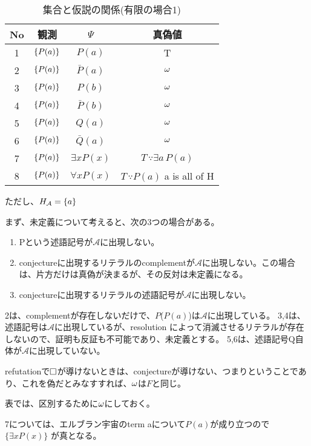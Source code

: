 \documentclass[10pt, oneside]{jarticle}   	%
\begin{document}
\begin{table}[htbp]
 \centering
 \begin{tabular}{|c|c|c|c|}\hline
   No & 観測 & $\Psi$ & 真偽値 \\ \hline
   1 & $\{{P(a)}\}$ & $P(a)$ & T \\ \hline
   2 & $\{{P(a)}\}$ & $\bar P(a)$ &$\omega$  \\ \hline
   3 & $\{{P(a)}\}$ & $P(b)$ & $\omega$ \\ \hline
   4 & $\{{P(a)}\}$ & $\bar P(b)$ & $\omega$ \\ \hline
   5 & $\{{P(a)}\}$ & $Q(a)$ & $\omega$ \\ \hline
   6 & $\{{P(a)}\}$ & $\bar Q(a)$ & $\omega$ \\ \hline
   7 & $\{{P(a)}\}$ & $\exists x P(x)$ & $T \, \because \exists a \, P(a)$ \\ \hline
   8 & $\{{P(a)}\}$ & $\forall x P(x)$ & $T  \, \because P(a) $ a  is all of  H \\ \hline
 \end{tabular}
 \caption{集合と仮説の関係(有限の場合1)}
 \label{tab:ex0101}
\end{table}

ただし、$H_{\mathcal{A}} = \{{a}\}$


まず、未定義について考えると、次の3つの場合がある。
\begin{enumerate}
\item Pという述語記号が$\mathcal{A}$に出現しない。
\item conjectureに出現するリテラルのcomplementが$\mathcal{A}$に出現しない。この場合は、片方だけは真偽が決まるが、その反対は未定義になる。
\item conjectureに出現するリテラルの述語記号が$\mathcal{A}$に出現しない。
\end{enumerate}

2は、complementが存在しないだけで、$P$($P(a)$)は$\mathcal{A}$に出現している。
3,4は、述語記号は$\mathcal{A}$に出現しているが、resolution によって消滅させるリテラルが存在しないので、証明も反証も不可能であり、未定義とする。
5,6は、述語記号Q自体が$\mathcal{A}$に出現していない。

refutationで$\Box$が導けないときは、conjectureが導けない、つまりということであり、これを偽だとみなすすれば、$\omega$は$F$と同じ。

表では、区別するために$\omega$にしておく。

7については、エルブラン宇宙のterm aについて$P(a)$が成り立つので$\{\exists x P(x)\}$ が真となる。
\end{document}
